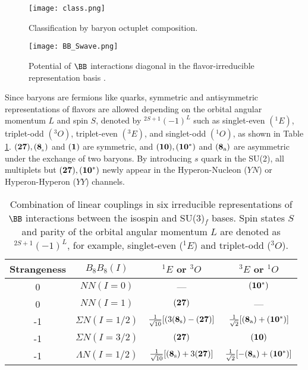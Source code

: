 \begin{figure}[h]
 \begin{center}
   \texttt{[image: class.png]}
   \caption{Classification by baryon octuplet composition.}
   \label{fig-class}
 \end{center}
\end{figure}

\begin{figure}[h]
 \begin{center}
   \texttt{[image: BB\_Swave.png]}
   \caption{Potential of $\BB$ interactions diagonal in the flavor-irreducible representation basis \cite{QCD-2019}.}
   \label{fig-BB_Swave}
 \end{center}
\end{figure}

Since baryons are fermions like quarks, symmetric and antisymmetric representations of flavors are allowed depending on the orbital angular momentum $L$ and spin $S$, denoted by $^{2S+1}(-1)^{L}$ such as singlet-even $(^1E)$, triplet-odd $(^3O)$, triplet-even $(^3E)$, and singlet-odd $(^1O)$, as shown in Table \ref{table-BBint}. %
${\bf (27), (8_{\rm_{s}})}$ and ${\bf (1)}$ are symmetric, and ${\bf (10), (10^*)}$ and ${\bf (8_{\rm{a}})}$ are asymmetric under the exchange of two baryons. By introducing $s$ quark in the SU(2), all multiplets but ${\bf (27), (10^*)}$ newly appear in the Hyperon-Nucleon ($YN$) or Hyperon-Hyperon ($YY$) channels. 

\begin{table}[h]
  \begin{center}
    \caption{Combination of linear couplings in six irreducible representations of $\BB$ interactions between the isospin and SU(3)$_f$ bases. Spin states $S$ and parity of the orbital angular momentum $L$ are denoted as ${}^{2S+1}(-1)^{L}$, for example, singlet-even (${}^{1}E$) and triplet-odd (${}^{3}O$).}
    \begin{tabular}{cccc} \hline \hline
      Strangeness & $B_{8}B_{8}(I)$ & $^1E$ or $^3O$ & $^3E$ or $^1O$ \\ \hline
      0 & $NN (I=0)$ & --- & ${\bf (10^*)}$ \\
      0 & $NN (I=1)$ & ${\bf (27)}$ & --- \\ \hline
      -1 & $\Sigma N (I=1/2)$ & $\frac{1}{\sqrt{10}}[(3({\bf 8_{\rm{s}}})-{\bf (27)}]$ & $\frac{1}{\sqrt{2}}[({\bf 8_{\rm{a}}})+{\bf (10^*)}]$ \\
      -1 & $\Sigma N (I=3/2)$ & ${\bf (27)}$ & ${\bf (10)}$ \\ \hline
      -1 & $\Lambda N (I=1/2)$ & $\frac{1}{\sqrt{10}}[({\bf 8_{\rm{s}}})+3{\bf (27)}]$ & $\frac{1}{\sqrt{2}}[-({\bf 8_{\rm{a}}})+{\bf (10^*)}]$ \\ \hline\hline
   \end{tabular}
   \label{table-BBint}
   \end{center}
\end{table}

